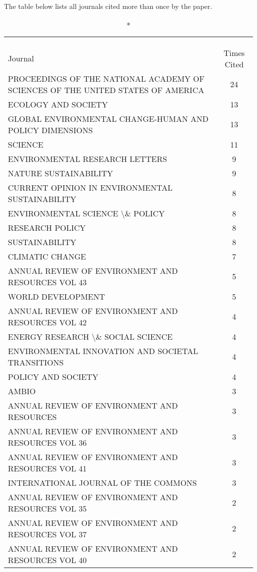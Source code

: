 \documentclass[]{article}
\begin{document}
The table below lists all journals cited more than once by the paper.
\captionsetup[table]{labelformat=empty,skip=1pt}

\begin{longtable}{lc}
\caption*{
\large Most Cited Journals\textsuperscript{1}\\ 
\small \textsuperscript{}\\ 
} \\ 
\toprule
Journal & Times Cited \\ 
\midrule
PROCEEDINGS OF THE NATIONAL ACADEMY OF SCIENCES OF THE UNITED STATES OF AMERICA & 24 \\ 
ECOLOGY AND SOCIETY & 13 \\ 
GLOBAL ENVIRONMENTAL CHANGE-HUMAN AND POLICY DIMENSIONS & 13 \\ 
SCIENCE & 11 \\ 
ENVIRONMENTAL RESEARCH LETTERS & 9 \\ 
NATURE SUSTAINABILITY & 9 \\ 
CURRENT OPINION IN ENVIRONMENTAL SUSTAINABILITY & 8 \\ 
ENVIRONMENTAL SCIENCE \textbackslash \& POLICY & 8 \\ 
RESEARCH POLICY & 8 \\ 
SUSTAINABILITY & 8 \\ 
CLIMATIC CHANGE & 7 \\ 
ANNUAL REVIEW OF ENVIRONMENT AND RESOURCES VOL 43 & 5 \\ 
WORLD DEVELOPMENT & 5 \\ 
ANNUAL REVIEW OF ENVIRONMENT AND RESOURCES VOL 42 & 4 \\ 
ENERGY RESEARCH \textbackslash \& SOCIAL SCIENCE & 4 \\ 
ENVIRONMENTAL INNOVATION AND SOCIETAL TRANSITIONS & 4 \\ 
POLICY AND SOCIETY & 4 \\ 
AMBIO & 3 \\ 
ANNUAL REVIEW OF ENVIRONMENT AND RESOURCES & 3 \\ 
ANNUAL REVIEW OF ENVIRONMENT AND RESOURCES VOL 36 & 3 \\ 
ANNUAL REVIEW OF ENVIRONMENT AND RESOURCES VOL 41 & 3 \\ 
INTERNATIONAL JOURNAL OF THE COMMONS & 3 \\ 
ANNUAL REVIEW OF ENVIRONMENT AND RESOURCES VOL 35 & 2 \\ 
ANNUAL REVIEW OF ENVIRONMENT AND RESOURCES VOL 37 & 2 \\ 
ANNUAL REVIEW OF ENVIRONMENT AND RESOURCES VOL 40 & 2 \\ 

\end{longtable}
\end{document}
